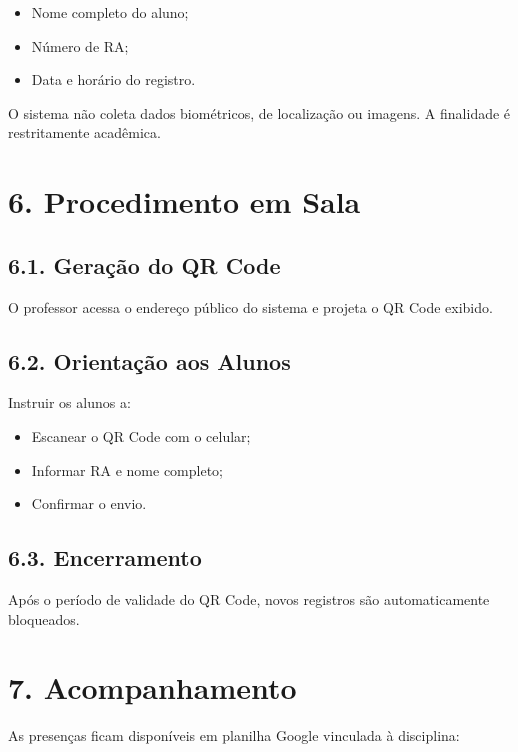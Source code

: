 \documentclass[12pt,a4paper]{article}
\begin{document}
\begin{itemize}
    \item Nome completo do aluno;
    \item Número de RA;
    \item Data e horário do registro.
\end{itemize}

O sistema não coleta dados biométricos, de localização ou imagens. A finalidade é restritamente acadêmica.


\section*{6. Procedimento em Sala}

\subsection*{6.1. Geração do QR Code}

O professor acessa o endereço público do sistema e projeta o QR Code exibido.

\subsection*{6.2. Orientação aos Alunos}

Instruir os alunos a:

\begin{itemize}
    \item Escanear o QR Code com o celular;
    \item Informar RA e nome completo;
    \item Confirmar o envio.
\end{itemize}

\subsection*{6.3. Encerramento}

Após o período de validade do QR Code, novos registros são automaticamente bloqueados.


\section*{7. Acompanhamento}

As presenças ficam disponíveis em planilha Google vinculada à disciplina:
\end{document}
